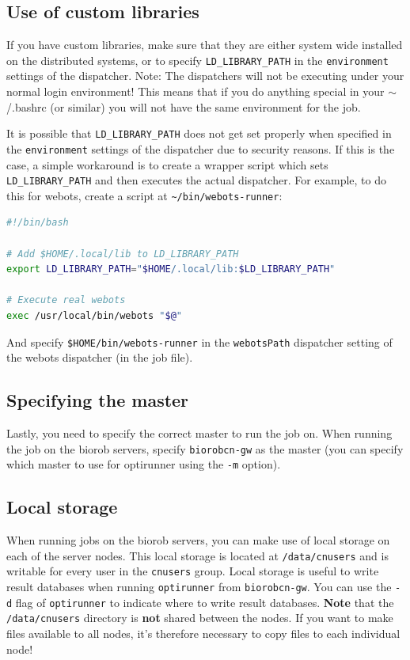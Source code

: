 \documentclass{report}
\begin{document}
\subsection{Use of custom libraries}
If you have custom libraries, make sure
that they are either system wide installed on the distributed systems, or to
specify \verb!LD_LIBRARY_PATH! in the \verb!environment! settings of the dispatcher.
Note: The dispatchers will not be executing under your normal login
environment! This means that if you do anything special in your $\sim$/.bashrc
(or similar) you will not have the same environment for the job.

It is possible that \verb!LD_LIBRARY_PATH! does not get set properly when specified
in the \verb!environment! settings of the dispatcher due to security reasons. If
this is the case, a simple workaround is to create a wrapper script which sets
\verb!LD_LIBRARY_PATH! and then executes the actual dispatcher. For example,
to do this for webots, create a script at \verb!~/bin/webots-runner!:

\begin{lstlisting}[language=sh]
#!/bin/bash

# Add $HOME/.local/lib to LD_LIBRARY_PATH
export LD_LIBRARY_PATH="$HOME/.local/lib:$LD_LIBRARY_PATH"

# Execute real webots
exec /usr/local/bin/webots "$@"
\end{lstlisting}

And specify \verb!$HOME/bin/webots-runner! in the \verb!webotsPath! dispatcher
setting of the webots dispatcher (in the job file).

\subsection{Specifying the master}
Lastly, you need to specify the correct master to run the job on. When running
the job on the biorob servers, specify \verb!biorobcn-gw! as the master (you
can specify which master to use for optirunner using the \verb!-m! option).

\subsection{Local storage}
When running jobs on the biorob servers, you can make use of local storage
on each of the server nodes. This local storage is located at \verb!/data/cnusers!
and is writable for every user in the \verb!cnusers! group. Local storage is
useful to write result databases when running \verb!optirunner! from
\verb!biorobcn-gw!. You can use the \verb!-d! flag of \verb!optirunner! to
indicate where to write result databases. \textbf{Note} that the
\verb!/data/cnusers! directory is \textbf{not} shared between the nodes. If you
want to make files available to all nodes, it's therefore necessary to copy
files to each individual node!
\end{document}
